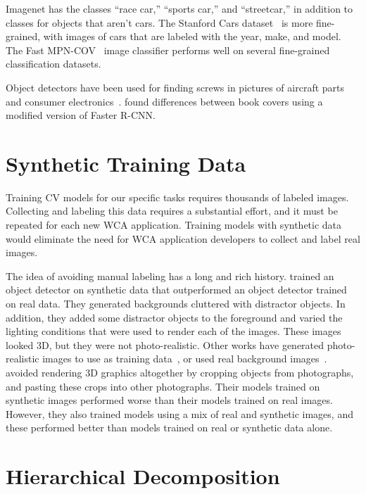 Imagenet has the classes ``race car,'' ``sports car,'' and ``streetcar,''
in addition to classes for objects that aren't cars. The Stanford Cars
dataset~\cite{KrauseStarkDengFei-Fei_3DRR2013} is more fine-grained, with
images of cars that are labeled with the year, make, and model.
The Fast MPN-COV~\cite{Li_2018_CVPR} image classifier performs
well on several fine-grained classification datasets.

Object detectors have been used for finding screws in pictures of aircraft
parts~\cite{visapp19} and consumer electronics~\cite{FOO2021666}.
\citet{wu2018spot} found differences between book covers using a modified
version of Faster R-CNN.

\section{Synthetic Training Data}

Training CV models for our specific tasks requires thousands of labeled images.
Collecting and labeling this data requires a substantial effort, and it must be
repeated for each new WCA application.
Training models with synthetic data would eliminate the need for WCA application
developers to collect and label real images.

The idea of avoiding manual labeling has a long and rich history.
\citet{synthetic} trained an object detector on synthetic data that
outperformed an object detector trained on real data. They generated backgrounds
cluttered with distractor objects. In addition, they added some distractor
objects to the foreground and varied the lighting conditions that were used to
render each of the images. These images looked 3D, but they were not
photo-realistic. Other works have generated photo-realistic images to use as
training data~\cite{DBLP:journals/corr/abs-1809-10790, photo2}, or used real
background images~\cite{real_background1, real_background2, real_background3}.
\citet{dwibedi} avoided rendering 3D graphics altogether by cropping objects
from photographs, and pasting these crops into other photographs.
Their models trained on synthetic images performed worse than their models
trained on real images.
However, they also  trained models using a mix of real and synthetic images, and
these performed better than models trained on real or synthetic data alone.

\section{Hierarchical Decomposition}

